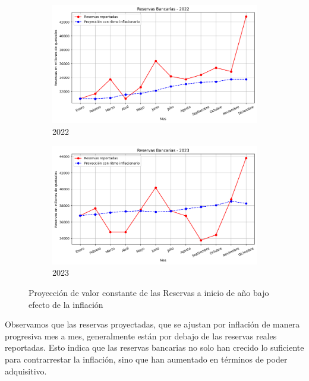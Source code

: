 \begin{figure}[H]
  \begin{subfigure}[b]{0.495\textwidth}
    \includegraphics[width=\linewidth]{imagenes/reservas_2022.png}
    \caption{2022}
  \end{subfigure}
  \begin{subfigure}[b]{0.495\textwidth}
    \includegraphics[width=\linewidth]{imagenes/reservas_2023.png}
    \caption{2023}
  \end{subfigure}
\caption{Proyección de valor constante de las Reservas a inicio de año bajo efecto de la inflación}
\end{figure}
\newpage
Observamos que las reservas proyectadas, que se ajustan por inflación de manera progresiva mes a mes, generalmente están por debajo de las reservas reales reportadas. Esto indica que las reservas bancarias no solo han crecido lo suficiente para contrarrestar la inflación, sino que han aumentado en términos de poder adquisitivo.
